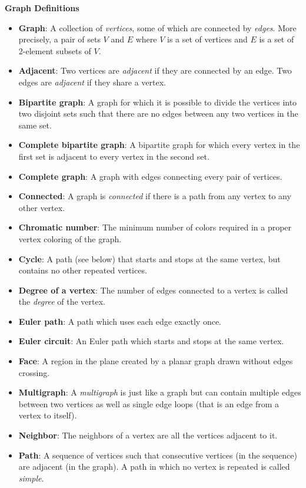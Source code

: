 \documentclass[11pt]{exam}
\begin{document}
\centerline{\bf Graph Definitions}
\begin{itemize}
    \item[] {\bf Graph}: A collection of {\em vertices}, some of which are connected by {\em edges}.  More precisely, a pair of sets $V$ and $E$ where $V$ is a set of vertices and $E$ is a set of 2-element subsets of $V$.
    \item[] {\bf Adjacent}: Two vertices are {\em adjacent} if they are connected by an edge.  Two edges are {\em adjacent} if they share a vertex.
    \item[] {\bf Bipartite graph}: A graph for which it is possible to divide the vertices into two disjoint sets such that there are no edges between any two vertices in the same set.
    \item[] {\bf Complete bipartite graph}: A bipartite graph for which every vertex in the first set is adjacent to every vertex in the second set.
    \item[] {\bf Complete graph}: A graph with edges connecting every pair of vertices.
    \item[] {\bf Connected}: A graph is {\em connected} if there is a path from any vertex to any other vertex.     
    \item[] {\bf Chromatic number}: The minimum number of colors required in a proper vertex coloring of the graph.
    \item[] {\bf Cycle}: A path (see below) that starts and stops at the same vertex, but contains no other repeated vertices.
    \item[] {\bf Degree of a vertex}: The number of edges connected to a vertex is called the {\em degree} of the vertex.
    \item[] {\bf Euler path}: A path which uses each edge exactly once.
    \item[] {\bf Euler circuit}: An Euler path which starts and stops at the same vertex. 
    \item[] {\bf Face}: A region in the plane created by a planar graph drawn without edges crossing.
    \item[] {\bf Multigraph}: A {\em multigraph} is just like a graph but can contain multiple edges between two vertices as well as single edge loops (that is an edge from a vertex to itself).
    \item[] {\bf Neighbor}: The neighbors of a vertex are all the vertices adjacent to it.
    \item[] {\bf Path}: A sequence of vertices such that consecutive vertices (in the sequence) are adjacent (in the graph).  A path in which no vertex is repeated is called {\em simple}.

\end{itemize}
\end{document}
